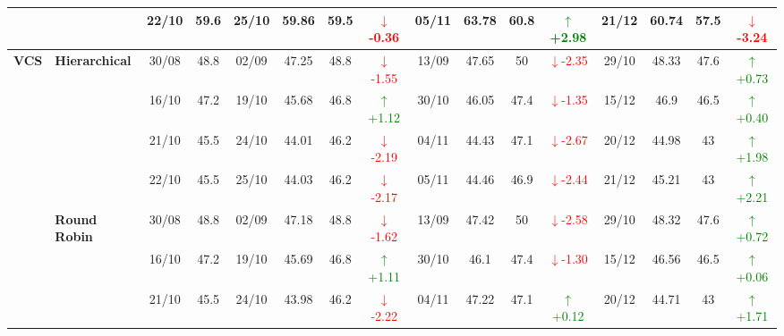 {\begin{longtable}{llcc|cccc|cccc|cccc}
&
& 22/10 & 59.6 & 25/10 & 59.86 & 59.5 & \textcolor{red}{\(\downarrow\)-0.36} & 05/11 & 63.78 & 60.8 & \textcolor{green}{\(\uparrow\)+2.98} & 21/12 & 60.74 & 57.5 & \textcolor{red}{\(\downarrow\)-3.24} \\
\midrule



\multirow{12}{*}{\textbf{VCS}} 
& \textbf{Hierarchical}
& 30/08 & 48.8 & 02/09 & 47.25 & 48.8 & \textcolor{red}{\(\downarrow\)-1.55} & 13/09 & 47.65 & 50 & \textcolor{red}{\(\downarrow\)-2.35} & 29/10 & 48.33 & 47.6 & \textcolor{green}{\(\uparrow\)+0.73} \\

&
& 16/10 & 47.2 & 19/10 & 45.68 & 46.8 & \textcolor{green}{\(\uparrow\)+1.12} & 30/10 & 46.05 & 47.4 & \textcolor{red}{\(\downarrow\)-1.35} & 15/12 & 46.9 & 46.5 & \textcolor{green}{\(\uparrow\)+0.40} \\

&
& 21/10 & 45.5 & 24/10 & 44.01 & 46.2 & \textcolor{red}{\(\downarrow\)-2.19} & 04/11 & 44.43 & 47.1 & \textcolor{red}{\(\downarrow\)-2.67} & 20/12 & 44.98 & 43 & \textcolor{green}{\(\uparrow\)+1.98} \\

&
& 22/10 & 45.5 & 25/10 & 44.03 & 46.2 & \textcolor{red}{\(\downarrow\)-2.17} & 05/11 & 44.46 & 46.9 & \textcolor{red}{\(\downarrow\)-2.44} & 21/12 & 45.21 & 43 & \textcolor{green}{\(\uparrow\)+2.21} \\
\cmidrule(lr){2-16}


& \textbf{Round Robin}
& 30/08 & 48.8 & 02/09 & 47.18 & 48.8 & \textcolor{red}{\(\downarrow\)-1.62} & 13/09 & 47.42 & 50 & \textcolor{red}{\(\downarrow\)-2.58} & 29/10 & 48.32 & 47.6 & \textcolor{green}{\(\uparrow\)+0.72} \\

&
& 16/10 & 47.2 & 19/10 & 45.69 & 46.8 & \textcolor{green}{\(\uparrow\)+1.11} & 30/10 & 46.1 & 47.4 & \textcolor{red}{\(\downarrow\)-1.30} & 15/12 & 46.56 & 46.5 & \textcolor{green}{\(\uparrow\)+0.06} \\

&
& 21/10 & 45.5 & 24/10 & 43.98 & 46.2 & \textcolor{red}{\(\downarrow\)-2.22} & 04/11 & 47.22 & 47.1 & \textcolor{green}{\(\uparrow\)+0.12} & 20/12 & 44.71 & 43 & \textcolor{green}{\(\uparrow\)+1.71} \\


\end{longtable}}
